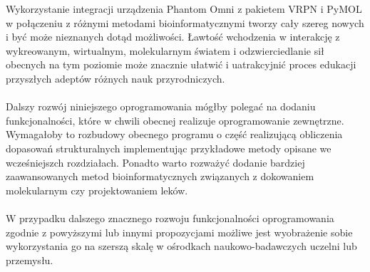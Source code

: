 \documentclass[licencjacka]{pracamgr}
\begin{document}
Wykorzystanie integracji urządzenia Phantom Omni z pakietem VRPN i PyMOL w połączeniu z różnymi metodami bioinformatycznymi tworzy cały szereg nowych i być może nieznanych dotąd możliwości. Ławtość wchodzenia w interakcję z wykreowanym, wirtualnym, molekularnym światem i odzwierciedlanie sił obecnych na tym poziomie może znacznie ułatwić i uatrakcyjnić proces edukacji przyszłych adeptów różnych nauk przyrodniczych.
\\
\\
Dalszy rozwój niniejszego oprogramowania mógłby polegać na dodaniu funkcjonalności, które w chwili obecnej realizuje oprogramowanie zewnętrzne. Wymagałoby to rozbudowy obecnego programu o część realizującą obliczenia dopasowań strukturalnych implementując przykładowe metody opisane we wcześniejszch rozdziałach. Ponadto warto rozważyć dodanie bardziej zaawansowanych metod bioinformatycznych związanych z dokowaniem molekularnym czy projektowaniem leków.
\\
\\
W przypadku dalszego znacznego rozwoju funkcjonalności oprogramowania zgodnie z powyższymi lub innymi propozycjami możliwe jest wyobrażenie sobie wykorzystania go na szerszą skalę w ośrodkach naukowo-badawczych uczelni lub przemysłu.
\\
\\
\end{document}
